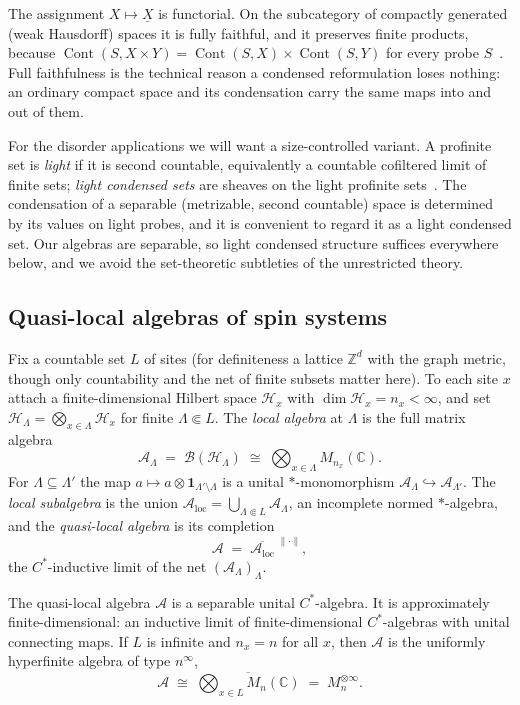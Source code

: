 \documentclass[12pt]{article}
\newcommand{\cond}[1]{\underline{#1}}          %
\newcommand{\Cont}{\operatorname{Cont}}        %
\newcommand{\qla}{\mathcal{A}}                  %
\newcommand{\loc}{\mathrm{loc}}                 %
\newcommand{\Hil}{\mathcal{H}}                  %
\newcommand{\CC}{\mathbb{C}}
\newcommand{\ZZ}{\mathbb{Z}}
\newcommand{\norm}[1]{\lVert #1 \rVert}
\newcommand{\id}{\mathbf{1}}
\theoremstyle{plain}
\begin{document}
The assignment $X\mapsto\cond{X}$ is functorial. On the subcategory of compactly
generated (weak Hausdorff) spaces it is fully faithful, and it preserves finite
products, because $\Cont(S,X\times Y)=\Cont(S,X)\times\Cont(S,Y)$ for every probe
$S$~\cite{clausen-scholze-condensed}. Full faithfulness is the technical reason a
condensed reformulation loses nothing: an ordinary compact space and its
condensation carry the same maps into and out of them.

For the disorder applications we will want a size-controlled variant. A profinite
set is \emph{light} if it is second countable, equivalently a countable cofiltered
limit of finite sets; \emph{light condensed sets} are sheaves on the light profinite
sets~\cite{clausen-scholze-analytic-stacks}. The condensation of a separable
(metrizable, second countable) space is determined by its values on light probes,
and it is convenient to regard it as a light condensed set. Our algebras are
separable, so light condensed structure suffices everywhere below, and we avoid the
set-theoretic subtleties of the unrestricted theory.

\subsection{Quasi-local algebras of spin systems}

Fix a countable set $L$ of sites (for definiteness a lattice $\ZZ^{d}$ with the
graph metric, though only countability and the net of finite subsets matter here).
To each site $x$ attach a finite-dimensional Hilbert space $\Hil_{x}$ with
$\dim\Hil_{x}=n_{x}<\infty$, and set $\Hil_{\Lambda}=\bigotimes_{x\in\Lambda}\Hil_{x}$
for finite $\Lambda\Subset L$. The \emph{local algebra} at $\Lambda$ is the full
matrix algebra
\[
  \qla_{\Lambda} \;=\; \mathcal{B}(\Hil_{\Lambda})
  \;\cong\; \bigotimes_{x\in\Lambda} M_{n_{x}}(\CC).
\]
For $\Lambda\subseteq\Lambda'$ the map $a\mapsto a\otimes\id_{\Lambda'\setminus\Lambda}$
is a unital $\ast$-monomorphism $\qla_{\Lambda}\hookrightarrow\qla_{\Lambda'}$. The
\emph{local subalgebra} is the union
$\qla_{\loc}=\bigcup_{\Lambda\Subset L}\qla_{\Lambda}$, an incomplete normed
$\ast$-algebra, and the \emph{quasi-local algebra} is its completion
\[
  \qla \;=\; \overline{\qla_{\loc}}^{\;\norm{\cdot}},
\]
the $C^{*}$-inductive limit of the net $(\qla_{\Lambda})_{\Lambda}$.

\begin{proposition}
\label{prop:uhf}
The quasi-local algebra $\qla$ is a separable unital $C^{*}$-algebra. It is
approximately finite-dimensional: an inductive limit of finite-dimensional
$C^{*}$-algebras with unital connecting maps. If $L$ is infinite and $n_{x}=n$ for
all $x$, then $\qla$ is the uniformly hyperfinite algebra of type $n^{\infty}$,
\[
  \qla \;\cong\; \overline{\bigotimes_{x\in L} M_{n}(\CC)}
        \;=\; M_{n}^{\otimes\infty}.
\]
\end{proposition}
\end{document}
